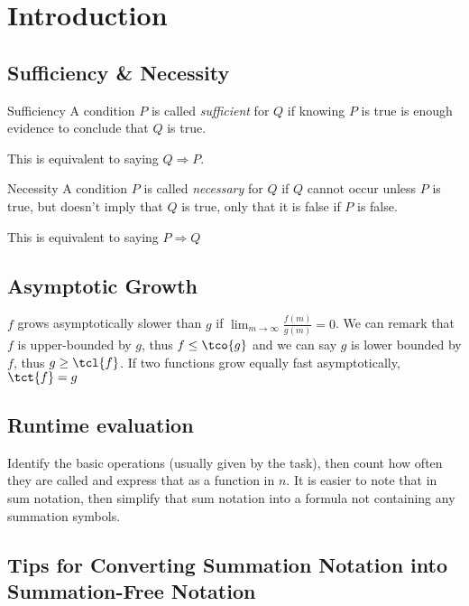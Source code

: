 \newsection
\section{Introduction}

\subsection{Sufficiency \& Necessity}
\begin{definition}[]{Sufficiency}
    A condition $P$ is called \textit{sufficient} for $Q$ if knowing $P$ is true is enough evidence to conclude that $Q$ is true.

    This is equivalent to saying $Q \Rightarrow P$.
\end{definition}

\begin{definition}[]{Necessity}
    A condition $P$ is called \textit{necessary} for $Q$ if $Q$ cannot occur unless $P$ is true, but doesn't imply that $Q$ is true, only that it is false if $P$ is false.

    This is equivalent to saying $P \Rightarrow Q$
\end{definition}

\subsection{Asymptotic Growth}
$f$ grows asymptotically slower than $g$ if $\displaystyle\lim_{m \rightarrow \infty} \frac{f(m)}{g(m)} = 0$.
We can remark that $f$ is upper-bounded by $g$, thus $f \leq \tco{g}$ and we can say $g$ is lower bounded by $f$, thus $g \geq \tcl{f}$.
If two functions grow equally fast asymptotically, $\tct{f} = g$


\subsection{Runtime evaluation}
Identify the basic operations (usually given by the task), then count how often they are called and express that as a function in $n$.
It is easier to note that in sum notation, then simplify that sum notation into a formula not containing any summation symbols.


\subsection{Tips for Converting Summation Notation into Summation-Free Notation}

